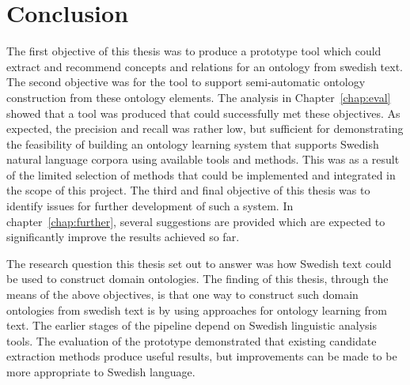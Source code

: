\documentclass[a4paper]{report}
\begin{document}
\chapter{Conclusion}

The first objective of this thesis was to produce a prototype tool which could extract and recommend concepts and relations for an ontology from swedish text.
The second objective was for the tool to support semi-automatic ontology construction from these ontology elements.
The analysis in Chapter~\ref{chap:eval} showed that a tool was produced that could successfully met these objectives.
As expected, the precision and recall was rather low, but sufficient for demonstrating the feasibility of building an ontology learning system that supports Swedish natural language corpora using available tools and methods.
This was as a result of the limited selection of methods that could be implemented and integrated in the scope of this project.
The third and final objective of this thesis was to identify issues for further development of such a system.
In chapter~\ref{chap:further}, several suggestions are provided which are expected to significantly improve the results achieved so far.

The research question this thesis set out to answer was how Swedish text could be used to construct domain ontologies.
The finding of this thesis, through the means of the above objectives, is that one way to construct such domain ontologies from swedish text is by using approaches for ontology learning from text.
The earlier stages of the pipeline depend on Swedish linguistic analysis tools.
The evaluation of the prototype demonstrated that existing candidate extraction methods produce useful results, but improvements can be made to be more appropriate to Swedish language.
\end{document}
